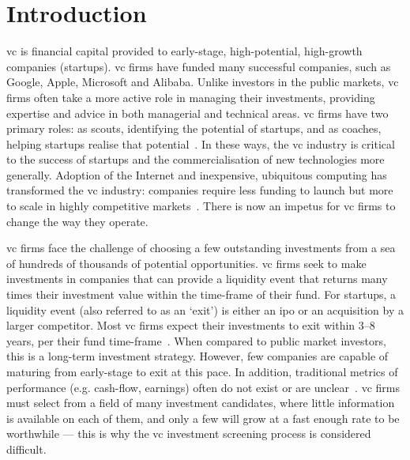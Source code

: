 \documentclass[../thesis/thesis.tex]{subfiles}
\begin{document}
\chapter{Introduction}
\label{chap:introduction}

\Gls{vc} is financial capital provided to early-stage, high-potential, high-growth companies (startups). \Gls{vc} firms have funded many successful companies, such as Google, Apple, Microsoft and Alibaba. Unlike investors in the public markets, \gls{vc} firms often take a more active role in managing their investments, providing expertise and advice in both managerial and technical areas. \Gls{vc} firms have two primary roles: as scouts, identifying the potential of startups, and as coaches, helping startups realise that potential~\cite{baum2004}. In these ways, the \gls{vc} industry is critical to the success of startups and the commercialisation of new technologies more generally. Adoption of the Internet and inexpensive, ubiquitous computing has transformed the \gls{vc} industry: companies require less funding to launch but more to scale in highly competitive markets~\cite{graham2013}. There is now an impetus for \gls{vc} firms to change the way they operate.

\Gls{vc} firms face the challenge of choosing a few outstanding investments from a sea of hundreds of thousands of potential opportunities. \Gls{vc} firms seek to make investments in companies that can provide a liquidity event that returns many times their investment value within the time-frame of their fund. For startups, a liquidity event (also referred to as an `exit') is either an \gls{ipo} or an acquisition by a larger competitor. Most \gls{vc} firms expect their investments to exit within 3--8 years, per their fund time-frame~\cite{gompers1995}. When compared to public market investors, this is a long-term investment strategy. However, few companies are capable of maturing from early-stage to exit at this pace. In addition, traditional metrics of performance (e.g. cash-flow, earnings) often do not exist or are unclear~\cite{ahlers2015}. \Gls{vc} firms must select from a field of many investment candidates, where little information is available on each of them, and only a few will grow at a fast enough rate to be worthwhile  --- this is why the \gls{vc} investment screening process is considered difficult.
\end{document}
